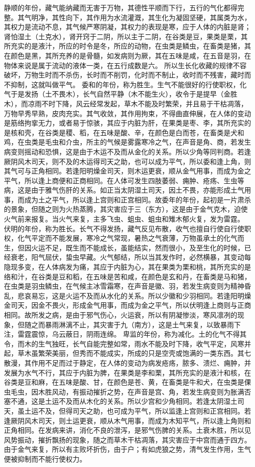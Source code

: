 \documentclass[a4paper,12pt,UTF8,twoside]{ctexbook}
\begin{document}
静顺的年份，藏气能纳藏而无害于万物，其德性平顺而下行，五行的气化都得完整。其气明净，其性向下，其作用为水流灌溉，其生化为凝固坚硬，其属类为水，其权力是流动不息，其气候严寒阴凝，其权力的表现是寒，应于人体的内脏是肾；肾怕湿土（土克水），肾开窍于二阴，所以主于二阴，在谷类是豆，果类是栗，其所充实的是液汁，所应的时令是冬，所应的动物，在虫类是鳞虫，在畜类是猪，其在颜色是黑，其所充养的是骨髓，如发病则为厥，其在五味是咸，在五音是羽，在物体来说是属于流动的液体一类，在五行成数是六。
所以生长化收藏的规律不容破坏，万物生时而不杀伤，长时而不削罚，化时而不制止，收时而不残害，藏时而不抑制，这就叫做平气。
委和的年份，称为胜生。生气不能很好的行使职权，化气于是发扬（土不畏木），长气自然平静（木不能生火），收令于是提早（金胜木），而凉雨不时下降，风云经常发起，草木不能及时繁荣，并且易于干枯凋落，万物早秀早熟，皮肉充实。其气收敛，其作用拘束，不得曲直伸展，在人体的变动是筋络拘挛无力，或者易于惊骇，其应于内脏为肝，在果类是枣、李，其所充实的是核和壳，在谷类是稷、稻，在五味是酸、辛，在颜色是白而苍，在畜类是犬和鸡，在虫类是毛虫和介虫，所主的气候是雾露寒冷之气，在声音是角、商，若发生病变则摇动和恐惧，这是由于木运不及而从金化的关系。所以少角等同判商。若逢厥阴风木司天，则不及的木运得司天之助，也可以成为平气，所以委和逢上角，则其气可与正角相同。若逢阳明燥金司天，则木运更衰，顺从金气用事，而成为金之平气，所以逢上商便和正商相同。在人体可发生四肢萎弱、痈肿、疮疡、生虫等病，这是由于雅气伤肝的关系。如正当太阴湿土司天，因土不畏，亦能形成土气用事，而成为土之平气，所以逢上宫则和正宫相同。故委年的年份，起初是一片肃杀的景象，但随之则为火热蒸腾，其灾害应于三（东方），这是由于金气克木，迫使火气前来报复。当火气来复，主多飞虫、蛆虫、蛆虫和雉木郁火复，发为雷霆。
伏明的年份，称为胜长。长气不得发扬，藏气反见布散，收气也擅自行使自行使职权，化气平定而不能发展，寒冷之气常现，暑热之气衰薄，万物虽承土的化气而生，但因火运不足，既生而不能成长，虽能结实，然而很小，及至生化的时候，已经衰老，阳气屈伏，蛰虫早藏。火气郁结，所以当其发作时，必然横暴，其变动每隐现多变，在人体病发为痛，其应于内脏为心，其在果类为栗和桃，其所充实的是络和汁，在谷类是豆和稻，在五味是苦和咸，在颜色是玄和丹，在畜类是马和猪，在虫类是羽虫鳞虫，在气候主冰雪霜寒，在声音是徽、羽，若发生病变则为精神昏乱，悲哀易忘，这是火运不及而从水化的关系。所以少徽和少羽相同。若逢阳明燥金司天，因金不畏火，形成金气用事，而成为金之平气，所以伏明逢上商则与正商相同。故所发之病，是由于邪气伤心，火运衰，所以有阴凝惨淡，寒风凛冽的现象，但随之而暴雨淋漓不止，其灾害于九（南方），这是土气来复，以致暴雨下注，雷霆震惊，乌云蔽日，阴雨连绵。
卑监的年份，称为减化。土的化气不得其令，而木的生气独旺，长气自能完整如常，雨水不能及时下降，收气平定，风寒并起，草木虽繁荣美丽，但秀而不能成实，所成的只是空壳或饱满的一类东西。其七散漫，其作用不足而过于静定，在人体的变动为病发疮疡，脓多、溃烂、痈肿，并发展为水气不行，其应于内脏为脾，在果类是李和栗，其所充实的是液汁和核，在谷类是豆和麻，在五味是酸、甘，在颜色是苍、黄，在畜类是牛和犬，在虫类是倮虫毛虫，因木胜风动，有振动摧折之势，在声音是宫、角，若发生病变则为胀满否塞不通，这是土运不及而从木化的关系。所以少宫和少角相同。若逢太阴湿土司天，虽土运不及，但得司天之助，也可成为平气，所以监逢上宫则和正宫相同。若逢厥阴风木司天，则土运更衰，顺从木气用事，而成为木知平气，所以逢上角则和正角相同。在发病来讲，消化不良的泄泻，是邪气伤脾的关系。土衰木胜，所以见风势振动，摧折飘扬的现象，随之而草木干枯凋落，其灾害应于中宫而通于四方。由于金气来复，所以有主败坏折伤，由于户；有如虎狼之势，清气发生作用，生气便被抑制而不能行使权力。
\end{document}
